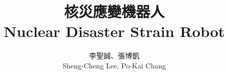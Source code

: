 \documentclass[letterpaper, 10 pt, conference]{ieeeconf}
\title{\LARGE \bf
核災應變機器人 \\
Nuclear Disaster Strain Robot}
\author{李聖誠、張博凱\\
Sheng-Cheng Lee, Po-Kai Chang}
\begin{document}
\begin{CJK}{UTF8}{bkai}

\maketitle

\thispagestyle{empty}
\pagestyle{empty}























\end{CJK}
\end{document}
